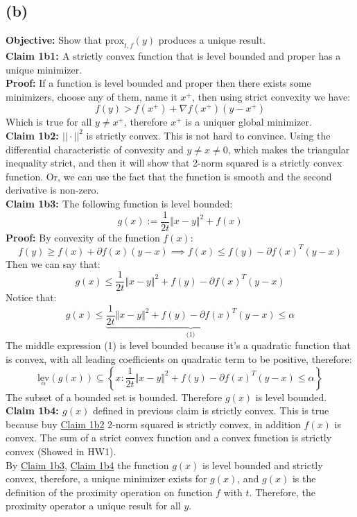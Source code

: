 \documentclass[]{article}
\begin{document}
    \subsection*{(b)}
        \textbf{Objective: } Show that $\text{prox}_{t,f}(y)$ produces a unique result.
        \\ 
        \textbf{Claim 1b1: \label{1b1}} A strictly convex function that is level bounded and proper has a unique minimizer. 
        \\ \textbf{Proof: }If a function is level bounded and proper then there exists some minimizers, choose any of them, name it $x^+$, then using strict convexity we have: 
        $$
            f(y) > f(x^+) + \nabla f(x^+)(y - x^+)
        $$
        Which is true for all $y\not= x^+$, therefore $x^+$ is a uniquer global minimizer. 
        \\
        \textbf{Claim 1b2: \label{1b2}} $||\cdot||^2$ is strictly convex. This is not hard to convince. Using the differential characteristic of convexity and $y\not = x\not = 0$, which makes the triangular inequality strict, and then it will show that 2-norm squared is a strictly convex function. Or, we can use the fact that the function is smooth and the second derivative is non-zero. 
        \\
        \textbf{Claim 1b3: \label{1b3}} The following function is level bounded: $$g(x) := \frac{1}{2t}\Vert x - y \Vert^2 + f(x)$$
        \textbf{Proof:}
        By convexity of the function $f(x)$: 
        $$
            f(y) \ge f(x) + \partial f(x)(y - x) \implies f(x)\le f(y) - \partial f(x)^T(y - x)
        $$
        Then we can say that: 
        $$
            g(x) \le \frac{1}{2t}\Vert x - y\Vert^2 + f(y) - \partial f(x)^T(y - x)
        $$
        Notice that: 
        $$
        g(x) 
        \le 
            \underbrace{\frac{1}{2t}\Vert x - y\Vert^2 + f(y) - \partial f(x)^T(y - x)}_\text{(1)}
        \le \alpha
        $$
        The middle expression (1) is level bounded because it's a quadratic function that is convex, with all leading coefficients on quadratic term to be positive, therefore: 
        $$
            \underset{\alpha}{\text{lev}}(g(x)) \subseteq 
            \left\lbrace x: \frac{1}{2t}\Vert x - y\Vert^2 + f(y) - \partial f(x)^T(y - x) \le \alpha \right\rbrace
        $$
        The subset of a bounded set is bounded. Therefore $g(x)$ is level bounded. 
        \\
        \textbf{Claim 1b4: \label{1b4}} $g(x)$ defined in previous claim is strictly convex. This is true because buy \hyperref[1b2]{Claim 1b2} 2-norm squared is strictly convex, in addition $f(x)$ is convex. The sum of a strict convex function and a convex function is strictly convex (Showed in HW1). 
        \\
        By \hyperref[1b3]{Claim 1b3}, \hyperref[1b4]{Claim 1b4} the function $g(x)$ is level bounded and strictly convex, therefore, a unique minimizer exists for $g(x)$, and $g(x)$ is the definition of the proximity operation on function $f$ with $t$. Therefore, the proximity operator a unique result for all $y$. 
\end{document}
